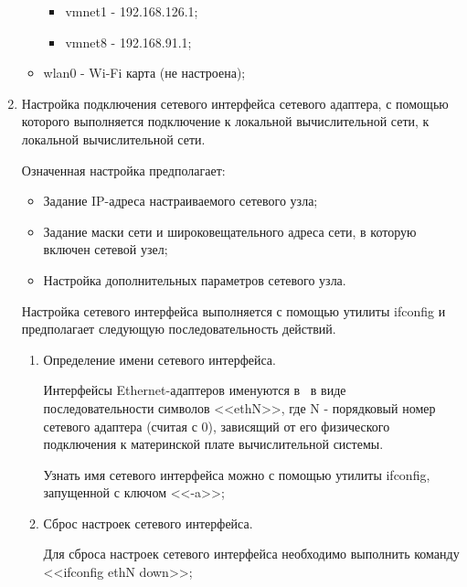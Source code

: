 \begin{enumerate}
\begin{itemize}
				\begin{itemize}

					\item vmnet1 - 192.168.126.1;
					\item vmnet8 - 192.168.91.1;

				\end{itemize}

			\item wlan0 - Wi-Fi карта (не настроена);

		\end{itemize}

		\item Настройка подключения сетевого интерфейса сетевого адаптера, с помощью которого выполняется подключение к локальной
		вычислительной сети, к локальной вычислительной сети.

		Означенная настройка предполагает:

		\begin{itemize}

			\item Задание IP-адреса настраиваемого сетевого узла;
			\item Задание маски сети и широковещательного адреса сети, в которую включен сетевой узел;
			\item Настройка дополнительных параметров сетевого узла.

		\end{itemize}

		Настройка сетевого интерфейса выполняется с помощью утилиты ifconfig и предполагает следующую последовательность действий.

		\begin{enumerate}

			\item Определение имени сетевого интерфейса.

			Интерфейсы Ethernet-адаптеров именуются в \linux\ в виде последовательности символов <<ethN>>, где N -
			порядковый номер сетевого адаптера (считая с 0), зависящий от его физического подключения к
			материнской плате вычислительной системы.

			Узнать имя сетевого интерфейса можно с помощью утилиты ifconfig, запущенной с ключом <<-a>>;

			\item Сброс настроек сетевого интерфейса.

			Для сброса настроек сетевого интерфейса необходимо выполнить команду <<ifconfig ethN down>>;


\end{enumerate}
\end{enumerate}
